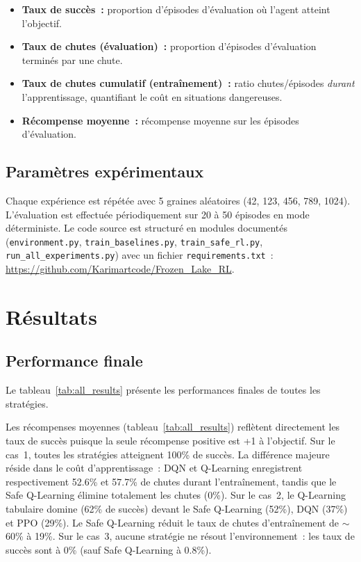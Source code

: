 \documentclass{article}
\begin{document}
\begin{itemize}
    \item \textbf{Taux de succès~:} proportion d'épisodes d'évaluation où l'agent atteint l'objectif.
    \item \textbf{Taux de chutes (évaluation)~:} proportion d'épisodes d'évaluation terminés par une chute.
    \item \textbf{Taux de chutes cumulatif (entraînement)~:} ratio chutes/épisodes \textit{durant} l'apprentissage, quantifiant le coût en situations dangereuses.
    \item \textbf{Récompense moyenne~:} récompense moyenne sur les épisodes d'évaluation.
\end{itemize}

\subsection{Paramètres expérimentaux}

Chaque expérience est répétée avec 5 graines aléatoires (42, 123, 456, 789, 1024). L'évaluation est effectuée périodiquement sur 20 à 50 épisodes en mode déterministe. Le code source est structuré en modules documentés (\texttt{environment.py}, \texttt{train\_baselines.py}, \texttt{train\_safe\_rl.py}, \texttt{run\_all\_experiments.py}) avec un fichier \texttt{requirements.txt}~: \url{https://github.com/Karimartcode/Frozen_Lake_RL}.


\section{Résultats}

\subsection{Performance finale}

Le tableau~\ref{tab:all_results} présente les performances finales de toutes les stratégies.



Les récompenses moyennes (tableau~\ref{tab:all_results}) reflètent directement les taux de succès puisque la seule récompense positive est +1 à l'objectif. Sur le cas~1, toutes les stratégies atteignent 100\% de succès. La différence majeure réside dans le coût d'apprentissage~: DQN et Q-Learning enregistrent respectivement 52.6\% et 57.7\% de chutes durant l'entraînement, tandis que le Safe Q-Learning élimine totalement les chutes (0\%). Sur le cas~2, le Q-Learning tabulaire domine (62\% de succès) devant le Safe Q-Learning (52\%), DQN (37\%) et PPO (29\%). Le Safe Q-Learning réduit le taux de chutes d'entraînement de $\sim$60\% à 19\%. Sur le cas~3, aucune stratégie ne résout l'environnement~: les taux de succès sont à 0\% (sauf Safe Q-Learning à 0.8\%).
\end{document}
